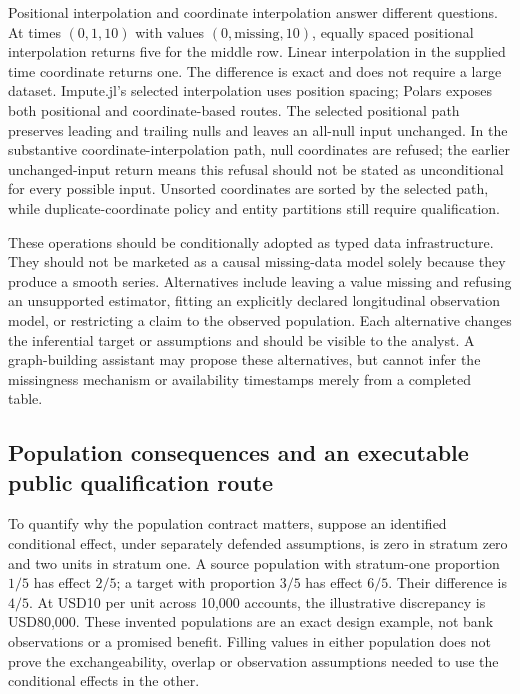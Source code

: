 Positional interpolation and coordinate interpolation answer different questions. At times $(0,1,10)$ with values $(0,\mathrm{missing},10)$, equally spaced positional interpolation returns five for the middle row. Linear interpolation in the supplied time coordinate returns one. The difference is exact and does not require a large dataset. Impute.jl's selected interpolation uses position spacing; Polars exposes both positional and coordinate-based routes. The selected positional path preserves leading and trailing nulls and leaves an all-null input unchanged. In the substantive coordinate-interpolation path, null coordinates are refused; the earlier unchanged-input return means this refusal should not be stated as unconditional for every possible input. Unsorted coordinates are sorted by the selected path, while duplicate-coordinate policy and entity partitions still require qualification.~\citep{exec25_otm_imputejl,exec25_otm_polars,exec25_otm_choice}

These operations should be conditionally adopted as typed data infrastructure. They should not be marketed as a causal missing-data model solely because they produce a smooth series. Alternatives include leaving a value missing and refusing an unsupported estimator, fitting an explicitly declared longitudinal observation model, or restricting a claim to the observed population. Each alternative changes the inferential target or assumptions and should be visible to the analyst. A graph-building assistant may propose these alternatives, but cannot infer the missingness mechanism or availability timestamps merely from a completed table.~\citep{exec25_otm_choice}

\subsection{Population consequences and an executable public qualification route}

To quantify why the population contract matters, suppose an identified conditional effect, under separately defended assumptions, is zero in stratum zero and two units in stratum one. A source population with stratum-one proportion $1/5$ has effect $2/5$; a target with proportion $3/5$ has effect $6/5$. Their difference is $4/5$. At USD10 per unit across 10,000 accounts, the illustrative discrepancy is USD80,000. These invented populations are an exact design example, not bank observations or a promised benefit. Filling values in either population does not prove the exchangeability, overlap or observation assumptions needed to use the conditional effects in the other.~\citep{exec25_otm_choice}

